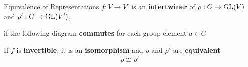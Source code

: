 \begin{frame}{Equivalence of Representations}
    \large
    $f: V \to V'$ is an \textbf{intertwiner} of $\rho: G \to \operatorname{GL}(V)$ and $\rho': G \to \operatorname{GL}(V')$,
    
    if the following diagram \textbf{commutes} for each group element $a \in G$
    
    \begin{figure}[h]
        \centering
    \end{figure}
    
    \vspace*{1em}
    \pause
    If $f$ is \textbf{invertible}, it is an \textbf{isomorphism} and $\rho$ and $\rho'$ are \textbf{equivalent}
    \begin{align*}
        \rho \cong \rho'
    \end{align*}
    
    \normalsize
    {\hspace*{\fill} \cite{fuchs2003}}
\end{frame}
